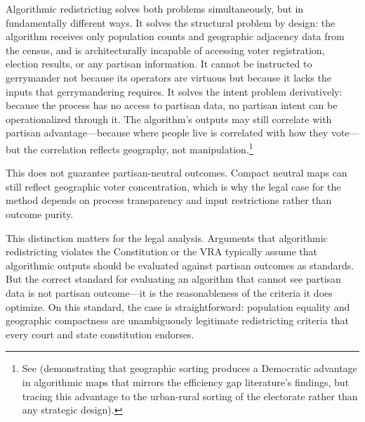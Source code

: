 Algorithmic redistricting solves both problems simultaneously, but in fundamentally different ways. It solves the structural problem by design: the algorithm receives only population counts and geographic adjacency data from the census, and is architecturally incapable of accessing voter registration, election results, or any partisan information. It cannot be instructed to gerrymander not because its operators are virtuous but because it lacks the inputs that gerrymandering requires. It solves the intent problem derivatively: because the process has no access to partisan data, no partisan intent can be operationalized through it. The algorithm's outputs may still correlate with partisan advantage---because where people live is correlated with how they vote---but the correlation reflects geography, not manipulation.\footnote{See \citet{dellaLibera2026recursive} (demonstrating that geographic sorting produces a Democratic advantage in algorithmic maps that mirrors the efficiency gap literature's findings, but tracing this advantage to the urban-rural sorting of the electorate rather than any strategic design).}

This does not guarantee partisan-neutral outcomes. Compact neutral maps can still reflect geographic voter concentration, which is why the legal case for the method depends on process transparency and input restrictions rather than outcome purity.

This distinction matters for the legal analysis. Arguments that algorithmic redistricting violates the Constitution or the VRA typically assume that algorithmic outputs should be evaluated against partisan outcomes as standards. But the correct standard for evaluating an algorithm that cannot see partisan data is not partisan outcome---it is the reasonableness of the criteria it does optimize. On this standard, the case is straightforward: population equality and geographic compactness are unambiguously legitimate redistricting criteria that every court and state constitution endorses.
